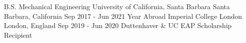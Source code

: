 \begin{cventries}
\cventry
{B.S. Mechanical Engineering}
{University of California, Santa Barbara}
{Santa Barbara, California}
{Sep 2017 - Jun 2021}
{
}
\cventry
{Year Abroad}
{Imperial College London}
{London, England}
{Sep 2019 - Jun 2020}
{Duttenhaver \& UC EAP Scholarship Recipient}
\end{cventries}

